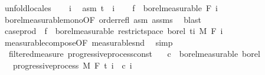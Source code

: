 \begin{isabellebody}
%
\isadelimproof
%
\endisadelimproof
%
\isatagproof
{}\isamarkupfalse%
\ {\isacharparenleft}{\kern0pt}unfold{\isacharunderscore}{\kern0pt}locales{\isacharparenright}{\kern0pt}\isanewline
\ \ \isamarkupfalse%
\ i\ \isamarkupfalse%
\ asm{\isacharcolon}{\kern0pt}\ {\isachardoublequoteopen}t\ {\isasymle}\ i{\isachardoublequoteclose}\isanewline
\ \ \isamarkupfalse%
\ {\isachardoublequoteopen}f\ {\isasymin}\ borel{\isacharunderscore}{\kern0pt}measurable\ {\isacharparenleft}{\kern0pt}F\ i{\isacharparenright}{\kern0pt}{\isachardoublequoteclose}\ \isamarkupfalse%
\ borel{\isacharunderscore}{\kern0pt}measurable{\isacharunderscore}{\kern0pt}mono{\isacharbrackleft}{\kern0pt}OF\ order{\isachardot}{\kern0pt}refl\ asm{\isacharbrackright}{\kern0pt}\ assms\ \isamarkupfalse%
\ blast\isanewline
\ \ \isamarkupfalse%
\ {\isachardoublequoteopen}case{\isacharunderscore}{\kern0pt}prod\ {\isacharparenleft}{\kern0pt}{\isasymlambda}{\isacharunderscore}{\kern0pt}{\isachardot}{\kern0pt}\ f{\isacharparenright}{\kern0pt}\ {\isasymin}\ borel{\isacharunderscore}{\kern0pt}measurable\ {\isacharparenleft}{\kern0pt}restrict{\isacharunderscore}{\kern0pt}space\ borel\ {\isacharbraceleft}{\kern0pt}ti{\isacharbraceright}{\kern0pt}\ {\isasymOtimes}\isactrlsub M\ F\ i{\isacharparenright}{\kern0pt}{\isachardoublequoteclose}\ \isamarkupfalse%
\ measurable{\isacharunderscore}{\kern0pt}compose{\isacharbrackleft}{\kern0pt}OF\ measurable{\isacharunderscore}{\kern0pt}snd{\isacharbrackright}{\kern0pt}\ \isamarkupfalse%
\ simp\isanewline
{}\isamarkupfalse%
%
\endisatagproof
{\isafoldproof}%
%
\isadelimproof
\isanewline
%
\endisadelimproof
\isanewline
{}\isamarkupfalse%
\ {\isacharparenleft}{\kern0pt}\ filtered{\isacharunderscore}{\kern0pt}measure{\isacharparenright}{\kern0pt}\ progressive{\isacharunderscore}{\kern0pt}process{\isacharunderscore}{\kern0pt}const{\isacharcolon}{\kern0pt}\isanewline
\ \ \ {\isachardoublequoteopen}c\ {\isasymin}\ borel{\isacharunderscore}{\kern0pt}measurable\ borel{\isachardoublequoteclose}\isanewline
\ \ \ {\isachardoublequoteopen}progressive{\isacharunderscore}{\kern0pt}process\ M\ F\ t\ {\isacharparenleft}{\kern0pt}{\isasymlambda}i\ {\isacharunderscore}{\kern0pt}{\isachardot}{\kern0pt}\ c\ i{\isacharparenright}{\kern0pt}{\isachardoublequoteclose}\isanewline

\end{isabellebody}
